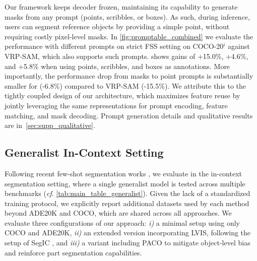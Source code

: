 Our framework keeps \sam{} decoder frozen, maintaining its capability to generate masks from any prompt (\ie points, scribbles, or boxes). As such, during inference, users can segment reference objects by providing a simple point, without requiring costly pixel-level masks. In \cref{fig:promptable_combined} we evaluate the performance with different prompts on strict FSS setting on COCO-20$^i$ against VRP-SAM, which also supports such prompts.
\ours{} shows gains of +15.0\%, +4.6\%, and +5.8\% when using points, scribbles, and boxes as annotations. More importantly, the performance drop from masks to point prompts is substantially smaller for \ours{} (-6.8\%) compared to VRP-SAM (-15.5\%). We attribute this to the tightly coupled design of our architecture, which maximizes feature reuse by jointly leveraging the same representations for prompt encoding, feature matching, and mask decoding. Prompt generation details and qualitative results are in~\cref{sec:supp_qualitative}.



\subsection{Generalist In-Context Setting}
\label{sec:in_context}

Following recent few-shot segmentation works \cite{meng2024segic, zhu2024unleashing, liu2023matcher, zhang2024bridge}, we evaluate \ours{} in the in-context segmentation setting, where a single generalist model is tested across multiple benchmarks (\textit{cf}. \cref{tab:main_table_generalist}). Given the lack of a standardized training protocol, we explicitly report additional datasets used by each method beyond ADE20K and COCO, which are shared across all approaches.
We evaluate three configurations of our approach: \textit{i)} a minimal setup using only COCO and ADE20K, \textit{ii)} an extended version incorporating LVIS, following the setup of SegIC \cite{meng2024segic}, and \textit{iii)} a variant including PACO to mitigate object-level bias and reinforce part segmentation capabilities.



